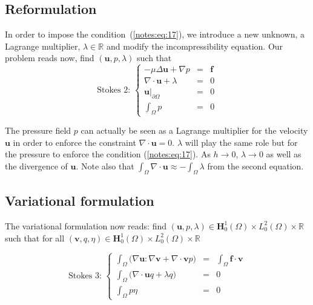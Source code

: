 \subsection{Reformulation}
  In order to impose the condition~(\ref{notes:eq:17}), we introduce a new
  unknown, a Lagrange multiplier, $\lambda \in \mathbb{R}$ and modify
  the incompressibility equation. Our problem reads now, find
  $(\mathbf{u},p,\lambda)$ such
  that
    \begin{equation}
      \label{notes:eq:18}
    \mbox{Stokes 2: }\left\{
      \begin{array}{rcl}
        -\mu\Delta\mathbf{u} +
        \nabla p &=&
        \mathbf{f}\\
        \nabla\cdot\mathbf{u} + \lambda &=& 0\\
        \mathbf{u}|_{\partial \Omega} &=& 0\\
        \int_\Omega p &=& 0
      \end{array}
    \right.
\end{equation}
\begin{remark}
  The pressure field $p$ can actually be seen as a Lagrange multiplier
  for the velocity $\mathbf{u}$ in order to enforce the constraint
  $\nabla \cdot \mathbf{u} = 0$. $\lambda$ will play the same role but
  for the pressure to enforce the condition (\ref{notes:eq:17}). As $h
  \rightarrow 0$, $\lambda \rightarrow 0$ as well as the divergence of
  $\mathbf{u}$. Note also that $\int_\Omega \nabla \cdot \mathbf{u}
  \approx - \int_\Omega \lambda$ from the second equation.
\end{remark}

\subsection{Variational formulation}
\label{sec:vari-form}

The variational formulation now reads: find $(\mathbf{u}, p,
\lambda) \in \mathbf{H}^1_0(\Omega) \times L^2_0(\Omega) \times
\mathbb{R}$ such that for all $(\mathbf{v}, q, \eta) \in
\mathbf{H}^1_0(\Omega) \times L^2_0(\Omega) \times \mathbb{R}$

\begin{equation}
  \label{notes:eq:20}
  \mbox{Stokes 3: }\left\{
    \begin{array}{rcl}
      \int_\Omega \Big(\nabla \mathbf{u} \colon \nabla \mathbf{v} + \nabla \cdot \mathbf{v} p\Big) &=& \int_\Omega \mathbf{f} \cdot \mathbf{v}\\
      \int_\Omega \Big(\nabla\cdot\mathbf{u} q + \lambda q\Big)   &=& 0\\
      \int_\Omega p \eta &=& 0
    \end{array}
  \right.
\end{equation}

